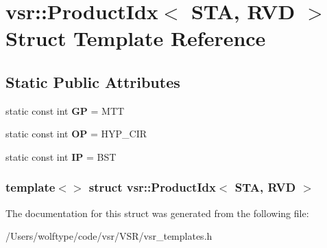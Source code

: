 \hypertarget{structvsr_1_1_product_idx_3_01_s_t_a_00_01_r_v_d_01_4}{\section{vsr\-:\-:Product\-Idx$<$ S\-T\-A, R\-V\-D $>$ Struct Template Reference}
\label{structvsr_1_1_product_idx_3_01_s_t_a_00_01_r_v_d_01_4}
}
\subsection*{Static Public Attributes}
\begin{DoxyCompactItemize}
\item 
\hypertarget{structvsr_1_1_product_idx_3_01_s_t_a_00_01_r_v_d_01_4_a79be6fe0de0f20b8d56951e6b4eaef21}{static const int {\bfseries G\-P} = M\-T\-T}\label{structvsr_1_1_product_idx_3_01_s_t_a_00_01_r_v_d_01_4_a79be6fe0de0f20b8d56951e6b4eaef21}

\item 
\hypertarget{structvsr_1_1_product_idx_3_01_s_t_a_00_01_r_v_d_01_4_a15ed08d51c1cb4d3f52cfec3d1841b32}{static const int {\bfseries O\-P} = H\-Y\-P\-\_\-\-C\-I\-R}\label{structvsr_1_1_product_idx_3_01_s_t_a_00_01_r_v_d_01_4_a15ed08d51c1cb4d3f52cfec3d1841b32}

\item 
\hypertarget{structvsr_1_1_product_idx_3_01_s_t_a_00_01_r_v_d_01_4_a7ceda7c2e5ea5a43f856047d9667b830}{static const int {\bfseries I\-P} = B\-S\-T}\label{structvsr_1_1_product_idx_3_01_s_t_a_00_01_r_v_d_01_4_a7ceda7c2e5ea5a43f856047d9667b830}

\end{DoxyCompactItemize}
\subsubsection*{template$<$$>$ struct vsr\-::\-Product\-Idx$<$ S\-T\-A, R\-V\-D $>$}



The documentation for this struct was generated from the following file\-:\begin{DoxyCompactItemize}
\item 
/\-Users/wolftype/code/vsr/\-V\-S\-R/vsr\-\_\-templates.\-h\end{DoxyCompactItemize}
